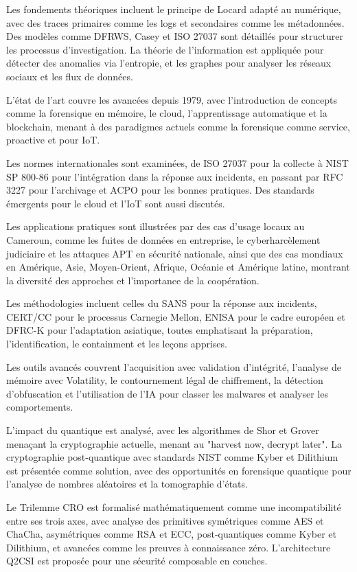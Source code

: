 \documentclass[a4paper,12pt]{extarticle}
\begin{document}
Les fondements théoriques incluent le principe de Locard adapté au numérique, avec des traces primaires comme les logs et secondaires comme les métadonnées. Des modèles comme DFRWS, Casey et ISO 27037 sont détaillés pour structurer les processus d'investigation. La théorie de l'information est appliquée pour détecter des anomalies via l'entropie, et les graphes pour analyser les réseaux sociaux et les flux de données.

L'état de l'art couvre les avancées depuis 1979, avec l'introduction de concepts comme la forensique en mémoire, le cloud, l'apprentissage automatique et la blockchain, menant à des paradigmes actuels comme la forensique comme service, proactive et pour IoT.

Les normes internationales sont examinées, de ISO 27037 pour la collecte à NIST SP 800-86 pour l'intégration dans la réponse aux incidents, en passant par RFC 3227 pour l'archivage et ACPO pour les bonnes pratiques. Des standards émergents pour le cloud et l'IoT sont aussi discutés.

Les applications pratiques sont illustrées par des cas d'usage locaux au Cameroun, comme les fuites de données en entreprise, le cyberharcèlement judiciaire et les attaques APT en sécurité nationale, ainsi que des cas mondiaux en Amérique, Asie, Moyen-Orient, Afrique, Océanie et Amérique latine, montrant la diversité des approches et l'importance de la coopération.

Les méthodologies incluent celles du SANS pour la réponse aux incidents, CERT/CC pour le processus Carnegie Mellon, ENISA pour le cadre européen et DFRC-K pour l'adaptation asiatique, toutes emphatisant la préparation, l'identification, le containment et les leçons apprises.

Les outils avancés couvrent l'acquisition avec validation d'intégrité, l'analyse de mémoire avec Volatility, le contournement légal de chiffrement, la détection d'obfuscation et l'utilisation de l'IA pour classer les malwares et analyser les comportements.

L'impact du quantique est analysé, avec les algorithmes de Shor et Grover menaçant la cryptographie actuelle, menant au "harvest now, decrypt later". La cryptographie post-quantique avec standards NIST comme Kyber et Dilithium est présentée comme solution, avec des opportunités en forensique quantique pour l'analyse de nombres aléatoires et la tomographie d'états.

Le Trilemme CRO est formalisé mathématiquement comme une incompatibilité entre ses trois axes, avec analyse des primitives symétriques comme AES et ChaCha, asymétriques comme RSA et ECC, post-quantiques comme Kyber et Dilithium, et avancées comme les preuves à connaissance zéro. L'architecture Q2CSI est proposée pour une sécurité composable en couches.
\end{document}
